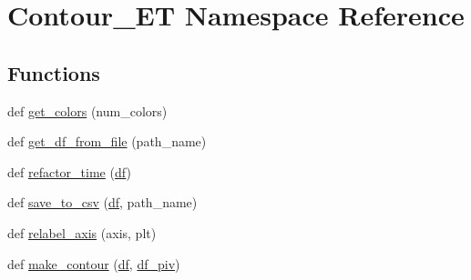 \hypertarget{namespace_contour___e_t}{}\section{Contour\+\_\+\+E\+T Namespace Reference}
\label{namespace_contour___e_t}
\subsection*{Functions}
\begin{DoxyCompactItemize}
\item 
def \hyperlink{namespace_contour___e_t_a4fecac488658fd1b99977ef8e39d5b5b}{get\+\_\+colors} (num\+\_\+colors)
\item 
def \hyperlink{namespace_contour___e_t_aedcf6d62d60dabb84683309eaa07b36c}{get\+\_\+df\+\_\+from\+\_\+file} (path\+\_\+name)
\item 
def \hyperlink{namespace_contour___e_t_aa24aa07cccaaf85a6757f39c28f31f8c}{refactor\+\_\+time} (\hyperlink{namespace_contour___e_t_ada636549e35711b9f1d5830a945e5472}{df})
\item 
def \hyperlink{namespace_contour___e_t_ae9bd39a079647783c05dbe6639ef91a5}{save\+\_\+to\+\_\+csv} (\hyperlink{namespace_contour___e_t_ada636549e35711b9f1d5830a945e5472}{df}, path\+\_\+name)
\item 
def \hyperlink{namespace_contour___e_t_a4c29753b8fe8e656b9b45e445b43f691}{relabel\+\_\+axis} (axis, plt)
\item 
def \hyperlink{namespace_contour___e_t_a90148b8c5b469f8ba98e2d231b2fb45b}{make\+\_\+contour} (\hyperlink{namespace_contour___e_t_ada636549e35711b9f1d5830a945e5472}{df}, \hyperlink{namespace_contour___e_t_afe10e2d562af1d0f4be9cc7b17a68e49}{df\+\_\+piv})
\end{DoxyCompactItemize}
